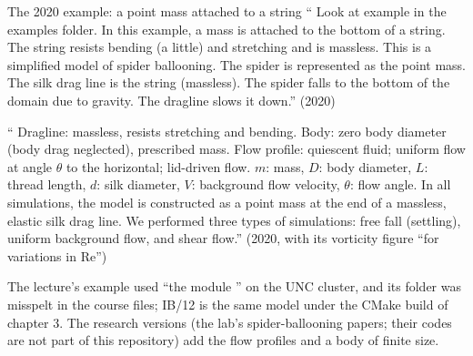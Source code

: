 \documentclass[aspectratio=169,11pt]{beamer}
\begin{document}
\begin{frame}{The 2020 example: a point mass attached to a string}
\label{fr:spider2020}
\small `` Look at example  in the examples folder. In this example, a mass is attached to the bottom of a string. The string resists bending (a little) and stretching and is massless. This is a simplified model of spider ballooning. The spider is represented as the point mass. The silk drag line is the string (massless). The spider falls to the bottom of the domain due to gravity. The dragline slows it down.'' (2020)
\vspace{1mm}

\small `` Dragline: massless, resists stretching and bending. Body: zero body diameter (body drag neglected), prescribed mass. Flow profile: quiescent fluid; uniform flow at angle $\theta$ to the horizontal; lid-driven flow. $m$: mass, $D$: body diameter, $L$: thread length, $d$: silk diameter, $V$: background flow velocity, $\theta$: flow angle. In all simulations, the model is constructed as a point mass at the end of a massless, elastic silk drag line. We performed three types of simulations: free fall (settling), uniform background flow, and shear flow.'' (2020, with its vorticity figure ``for variations in Re'')
\vspace{1mm}

\footnotesize The lecture's example used ``the module '' on the UNC cluster, and its folder was misspelt in the course files; IB/12 is the same model under the CMake build of chapter 3. The research versions (the lab's spider-ballooning papers; their codes are not part of this repository) add the flow profiles and a body of finite size.
\end{frame}
\end{document}
